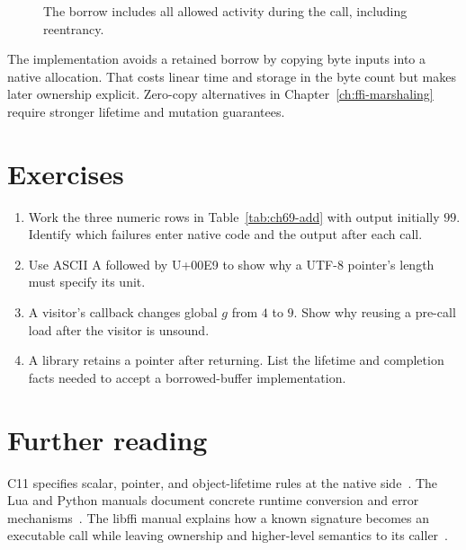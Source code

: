 \begin{figure}[htbp]
\centering
{}
\caption{The borrow includes all allowed activity during the call, including reentrancy.}
\label{fig:ch69-borrow}
\end{figure}

The implementation avoids a retained borrow by copying byte inputs into a native allocation.
That costs linear time and storage in the byte count but makes later ownership explicit.
Zero-copy alternatives in Chapter~\ref{ch:ffi-marshaling} require stronger lifetime and mutation guarantees.

\section{Exercises}
\label{sec:ch69-exercises}
\begin{enumerate}
\item\label{ex:ch69-range} Work the three numeric rows in Table~\ref{tab:ch69-add} with output initially $99$.
Identify which failures enter native code and the output after each call.
\item\label{ex:ch69-extent} Use ASCII A followed by U+00E9 to show why a UTF-8 pointer's length must specify its unit.
\item\label{ex:ch69-effect} A visitor's callback changes global $g$ from $4$ to $9$.
Show why reusing a pre-call load after the visitor is unsound.
\item\label{ex:ch69-retain} A library retains a pointer after returning.
List the lifetime and completion facts needed to accept a borrowed-buffer implementation.
\end{enumerate}

\section{Further reading}
\label{sec:ch69-reading}
C11 specifies scalar, pointer, and object-lifetime rules at the native side~\cite{wg14-2011-c11}.
The Lua and Python manuals document concrete runtime conversion and error mechanisms~\cite{ierusalimschy-2026-lua,python-2026-capi}.
The libffi manual explains how a known signature becomes an executable call while leaving ownership and higher-level semantics to its caller~\cite{libffi-2026-manual}.
